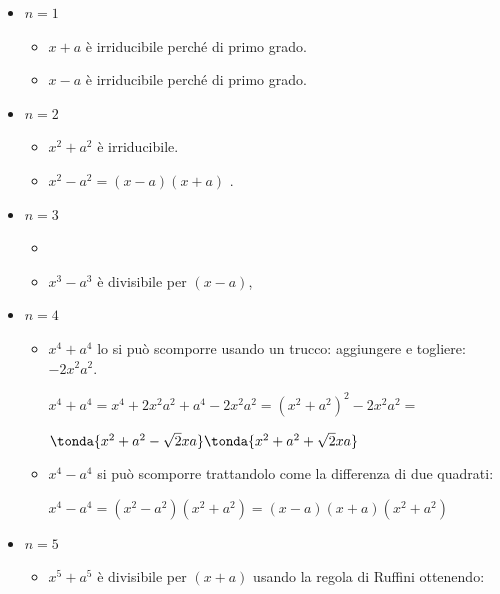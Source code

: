 \begin{itemize}[left=0mm, nosep]
\item \(n=1\)
\begin{itemize}[nosep]
\item \(x+a\) è irriducibile perché di primo grado.
\item \(x-a\) è irriducibile perché di primo grado.
\end{itemize}

\item \(n=2\)
\begin{itemize}[nosep]
\item \(x^2+a^2\) è irriducibile.
\item \(x^2-a^2=(x-a)(x+a)\) .
\end{itemize}

\item \(n=3\)
\begin{itemize}[nosep]
\item \myp
{}

\item \myp
\(x^3-a^3\) è divisibile per \((x-a)\),\\ 
\end{itemize}

\item \(n=4\)
\begin{itemize}[nosep]
\item \(x^4+a^4\) lo si può scomporre usando un trucco: 
aggiungere e togliere:~\(-2x^2a^2\).

\(x^4+a^4 = x^4+2x^2a^2+a^4-2x^2a^2 = (x^2+a^2)^2-2x^2a^2=\)

\(\tonda{x^2+a^2-\sqrt{2}xa}\tonda{x^2+a^2+\sqrt{2}xa}\)

\item \(x^4-a^4\) si può scomporre trattandolo come la differenza di due 
quadrati:

\(x^4-a^4 = (x^2-a^2)(x^2+a^2) = (x-a)(x+a)(x^2+a^2) \)
\end{itemize}

\item \(n=5\)
\begin{itemize}[nosep]
\item \(x^5+a^5\) è divisibile per \((x+a)\) usando la regola di Ruffini
ottenendo: 


\end{itemize}
\end{itemize}
